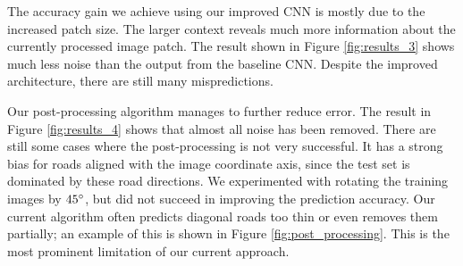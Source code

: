 \documentclass[10pt,conference,compsocconf]{IEEEtran}
\begin{document}
\par 
The accuracy gain we achieve using our improved CNN is mostly due to the increased patch size. The larger context reveals much more information about the currently processed image patch. The result shown in Figure \ref{fig:results_3} shows much less noise than the output from the baseline CNN. Despite the improved architecture, there are still many mispredictions. 

\par
Our post-processing algorithm manages to further reduce error. The result in Figure \ref{fig:results_4} shows that almost all noise has been removed. There are still some cases where the post-processing is not very successful. It has a strong bias for roads aligned with the image coordinate axis, since the test set is dominated by these road directions. We experimented with rotating the training images by $ 45\degree $, but did not succeed in improving the prediction accuracy. Our current algorithm often predicts diagonal roads too thin or even removes them partially; an example of this is shown in Figure \ref{fig:post_processing}. This is the most prominent limitation of our current approach.
\end{document}
